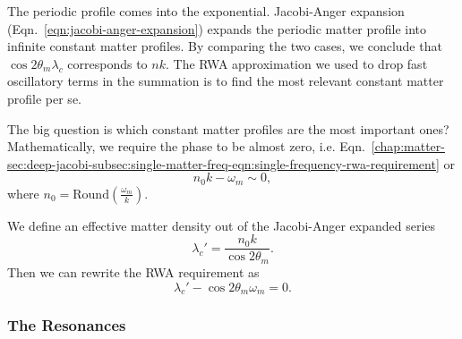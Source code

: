 
The periodic profile comes into the exponential. Jacobi-Anger expansion (Eqn.~\ref{eqn:jacobi-anger-expansion}) expands the periodic matter profile into infinite constant matter profiles. By comparing the two cases, we conclude that $\cos 2\theta_m\lambda_c$ corresponds to $nk$. The RWA approximation we used to drop fast oscillatory terms in the summation is to find the most relevant constant matter profile per se.

The big question is which constant matter profiles are the most important ones? Mathematically, we require the phase to be almost zero, i.e. Eqn.~\ref{chap:matter-sec:deep-jacobi-subsec:single-matter-freq-eqn:single-frequency-rwa-requirement} or
\begin{equation}
   n_0 k - \omega_m \sim 0 ,
\end{equation}
where $n_0=\mathrm{Round}\left( \frac{\omega_m}{k} \right)$.


We define an effective matter density out of the Jacobi-Anger expanded series
\begin{equation}
   \lambda_c' = \frac{n_0 k}{\cos 2\theta_m}. 
\end{equation}
Then we can rewrite the RWA requirement as
\begin{equation}
   \lambda_c' - \cos 2\theta_m \omega_m = 0. 
\end{equation}
   



\subsubsection{The Resonances}



